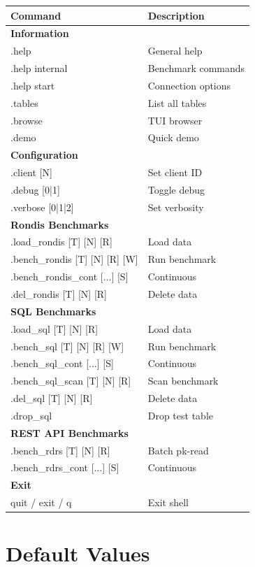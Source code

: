\documentclass[11pt,a4paper]{report}
\begin{document}
\begin{tabular}{ll}
\toprule
Command & Description \\
\midrule
\multicolumn{2}{l}{\textbf{Information}} \\
.help & General help \\
.help internal & Benchmark commands \\
.help start & Connection options \\
.tables & List all tables \\
.browse & TUI browser \\
.demo & Quick demo \\
\midrule
\multicolumn{2}{l}{\textbf{Configuration}} \\
.client [N] & Set client ID \\
.debug [0|1] & Toggle debug \\
.verbose [0|1|2] & Set verbosity \\
\midrule
\multicolumn{2}{l}{\textbf{Rondis Benchmarks}} \\
.load\_rondis [T] [N] [R] & Load data \\
.bench\_rondis [T] [N] [R] [W] & Run benchmark \\
.bench\_rondis\_cont [...] [S] & Continuous \\
.del\_rondis [T] [N] [R] & Delete data \\
\midrule
\multicolumn{2}{l}{\textbf{SQL Benchmarks}} \\
.load\_sql [T] [N] [R] & Load data \\
.bench\_sql [T] [N] [R] [W] & Run benchmark \\
.bench\_sql\_cont [...] [S] & Continuous \\
.bench\_sql\_scan [T] [N] [R] & Scan benchmark \\
.del\_sql [T] [N] [R] & Delete data \\
.drop\_sql & Drop test table \\
\midrule
\multicolumn{2}{l}{\textbf{REST API Benchmarks}} \\
.bench\_rdrs [T] [N] [R] & Batch pk-read \\
.bench\_rdrs\_cont [...] [S] & Continuous \\
\midrule
\multicolumn{2}{l}{\textbf{Exit}} \\
quit / exit / q & Exit shell \\
\bottomrule
\end{tabular}

\section{Default Values}
\end{document}

